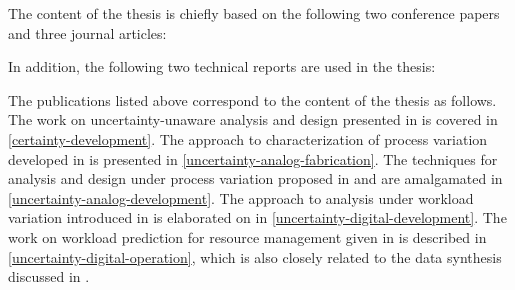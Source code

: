 The content of the thesis is chiefly based on the following two conference
papers and three journal articles:

\printbibliography[heading=none,keyword=own]

In addition, the following two technical reports are used in the thesis:

\printbibliography[heading=none,keyword=own-unpublished]

The publications listed above correspond to the content of the thesis as
follows. The work on uncertainty-unaware analysis and design presented in
\cite{ukhov2012} is covered in \cref{certainty-development}. The approach to
characterization of process variation developed in \cite{ukhov2014a} is
presented in \cref{uncertainty-analog-fabrication}. The techniques for analysis
and design under process variation proposed in \cite{ukhov2014b} and
\cite{ukhov2015} are amalgamated in \cref{uncertainty-analog-development}. The
approach to analysis under workload variation introduced in \cite{ukhov2017a} is
elaborated on in \cref{uncertainty-digital-development}. The work on workload
prediction for resource management given in \cite{ukhov2017b} is described in
\cref{uncertainty-digital-operation}, which is also closely related to the data
synthesis discussed in \cite{ukhov2017c}.
